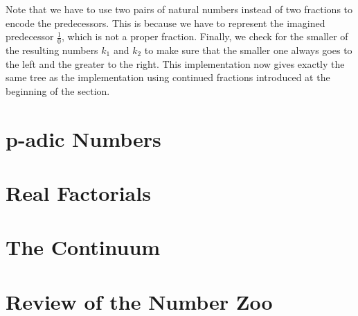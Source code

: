 \documentclass[tikz]{scrreprt}
\begin{document}
Note that we have to use two pairs of natural numbers
instead of two fractions to encode the predecessors.
This is because we have to represent the imagined
predecessor $\frac{1}{0}$, which is not a proper fraction.
Finally, we check for the smaller of the resulting numbers
$k_1$ and $k_2$ to make sure that the smaller one 
always goes to the left and the greater to the right.
This implementation now gives exactly the same tree
as the implementation using continued fractions
introduced at the beginning of the section.

\section{p-adic Numbers} 
\section{Real Factorials}
\section{The Continuum}
\section{Review of the Number Zoo}
\end{document}
